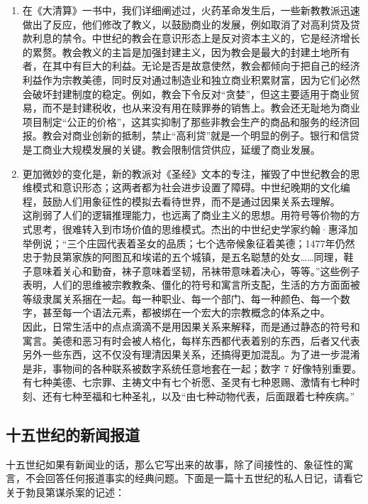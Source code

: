 \begin{enumerate}
    \item 在《大清算》一书中，我们详细阐述过，火药革命发生后，一些新教教派迅速做出了反应，他们修改了教义，以鼓励商业的发展，例如取消了对高利贷及贷款利息的禁令。中世纪的教会在意识形态上是反对资本主义的，它是经济增长的累赘。教会教义的主旨是加强封建主义，因为教会是最大的封建土地所有者，在其中有巨大的利益。无论是否是故意使然，教会都倾向于把自己的经济利益作为宗教美德，同时反对通过制造业和独立商业积累财富，因为它们必然会破坏封建制度的稳定。例如，教会下令反对“贪婪”，但这主要适用于商业贸易，而不是封建税收，也从来没有用在赎罪券的销售上。教会还无耻地为商业项目制定“公正的价格”，这其实抑制了那些非教会生产的商品和服务的经济回报。教会对商业创新的抵制，禁止“高利贷”就是一个明显的例子。银行和信贷是工商业大规模发展的关键。教会限制信贷供应，延缓了商业发展。
    \item 更加微妙的变化是，新的教派对《圣经》文本的专注，摧毁了中世纪教会的思维模式和意识形态；这两者都为社会进步设置了障碍。中世纪晚期的文化编程，鼓励人们用象征性的模拟去看待世界，而不是通过因果关系去理解。\\ 这削弱了人们的逻辑推理能力，也远离了商业主义的思想。用符号等价物的方式思考，很难转入到市场价值的思维模式。杰出的中世纪史学家约翰·惠泽加举例说；“三个庄园代表着圣女的品质；七个选帝候象征着美德；1477年仍然忠于勃艮第家族的阿图瓦和埃诺的五个城镇，是五名聪慧的处女……同理，鞋子意味着关心和勤奋，袜子意味着坚韧，吊袜带意味着决心，等等。”这些例子表明，人们的思维被宗教教条、僵化的符号和寓言所支配，生活的方方面面被等级隶属关系捆在一起。每一种职业、每一个部门、每一种颜色、每一个数字，甚至每一个语法元素，都被绑在一个宏大的宗教概念的体系之中。\\ 因此，日常生活中的点点滴滴不是用因果关系来解释，而是通过静态的符号和寓言。美德和恶习有时会被人格化，每样东西都代表着别的东西，后者又代表另外一些东西，这不仅没有理清因果关系，还搞得更加混乱。为了进一步混淆是非，事物间的各种联系被数字系统任意地套在一起；数字 7 好像特别重要。有七种美德、七宗罪、主祷文中有七个祈愿、圣灵有七种恩赐、激情有七种时刻、还有七种至福和七种圣礼，以及“由七种动物代表，后面跟着七种疾病。”
\end{enumerate}

\subsection{十五世纪的新闻报道}

十五世纪如果有新闻业的话，那么它写出来的故事，除了间接性的、象征性的寓言，不会回答任何报道事实的经典问题。下面是一篇十五世纪的私人日记，请看它关于勃艮第谋杀案的记述：


